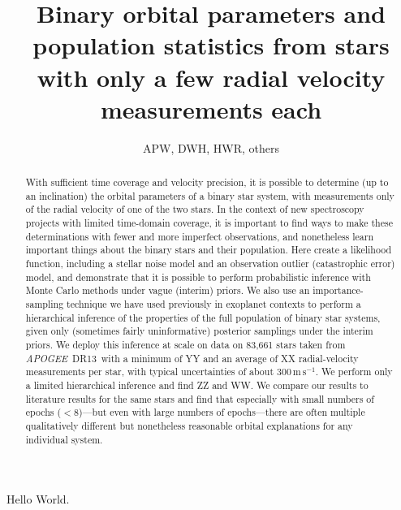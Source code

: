 \documentclass[12pt, preprint]{aastex}
\newcommand{\project}[1]{\textsl{#1}}
\newcommand{\acronym}[1]{{\small{#1}}}
\newcommand{\apogee}{\project{\acronym{APOGEE}}}
\newcommand{\dr}{\acronym{DR13}}
\newcommand{\meterspersecond}{\mathrm{m\,s^{-1}}}
\begin{document}
\title{Binary orbital parameters and population statistics
  from stars with only a few radial velocity measurements each}
\author{APW, DWH, HWR, others}

\begin{abstract}
With sufficient time coverage and velocity precision, it is possible
to determine (up to an inclination) the orbital parameters of a binary
star system, with measurements only of the radial velocity of one of
the two stars.
In the context of new spectroscopy projects with limited time-domain
coverage, it is important to find ways to make these determinations
with fewer and more imperfect observations, and nonetheless learn
important things about the binary stars and their population.
Here create a likelihood function, including a stellar noise model and
an observation outlier (catastrophic error) model, and demonstrate
that it is possible to perform probabilistic inference with Monte
Carlo methods under vague (interim) priors.
We also use an importance-sampling technique we have used previously
in exoplanet contexts to perform a hierarchical inference of the
properties of the full population of binary star systems, given only
(sometimes fairly uninformative) posterior samplings under the interim
priors.
We deploy this inference at scale on data on 83,661 stars taken from
\apogee\ \dr\, with a minimum of YY and an average of XX
radial-velocity measurements per star, with typical uncertainties of
about $300\,\meterspersecond$.
We perform only a limited hierarchical inference and find ZZ and WW.
We compare our results to literature results for the same stars and
find that especially with small numbers of epochs ($<8$)---but even
with large numbers of epochs---there are often multiple qualitatively
different but nonetheless reasonable orbital explanations for any
individual system.
\end{abstract}


Hello World.
\end{document}
